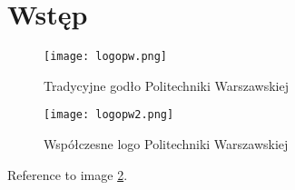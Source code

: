 \newpage %
\section{Wstęp}
\lipsum[2] \cite{goossens93}
\begin{figure}[!h]
	\caption{Tradycyjne godło Politechniki Warszawskiej}
    \label{fig:tradycyjne-logo-pw}
    \centering \texttt{[image: logopw.png]}
\end{figure}
\lipsum[2-3]
\begin{figure}[!h]
	\caption{Współczesne logo Politechniki Warszawskiej}
	\label{fig:nowe-logo-pw}
	\centering \texttt{[image: logopw2.png]}
\end{figure}
\lipsum[4-6] Reference to image \ref{fig:nowe-logo-pw}. 
